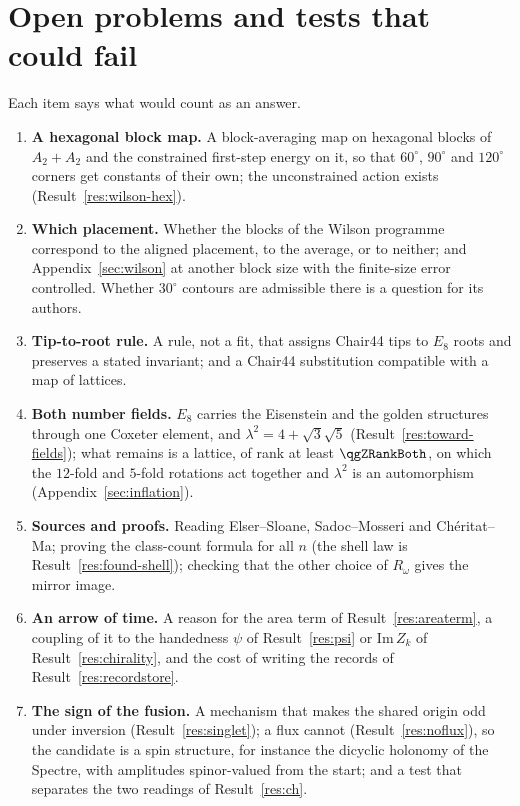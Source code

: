 \documentclass[11pt]{article}
\theoremstyle{definition}
\begin{document}
\section{Open problems and tests that could fail}\label{sec:open}
Each item says what would count as an answer.
\begin{enumerate}[leftmargin=1.6em,itemsep=1pt]
\item \textbf{A hexagonal block map.} A block-averaging map on hexagonal blocks of $A_2+A_2$ and the constrained first-step energy on it, so that $60^\circ$, $90^\circ$ and $120^\circ$ corners get constants of their own; the unconstrained action exists (Result~\ref{res:wilson-hex}).
\item \textbf{Which placement.} Whether the blocks of the Wilson programme correspond to the aligned placement, to the average, or to neither; and Appendix~\ref{sec:wilson} at another block size with the finite-size error controlled. Whether $30^\circ$ contours are admissible there is a question for its authors.
\item \textbf{Tip-to-root rule.} A rule, not a fit, that assigns Chair44 tips to $E_8$ roots and preserves a stated invariant; and a Chair44 substitution compatible with a map of lattices.
\item \textbf{Both number fields.} $E_8$ carries the Eisenstein and the golden structures through one Coxeter element, and $\lambda^2=4+\sqrt3\sqrt5$ (Result~\ref{res:toward-fields}); what remains is a lattice, of rank at least $\qgZRankBoth$, on which the $12$-fold and $5$-fold rotations act together and $\lambda^2$ is an automorphism (Appendix~\ref{sec:inflation}).
\item \textbf{Sources and proofs.} Reading Elser--Sloane, Sadoc--Mosseri and Ch\'eritat--Ma; proving the class-count formula for all $n$ (the shell law is Result~\ref{res:found-shell}); checking that the other choice of $R_\omega$ gives the mirror image.
\item\label{item:arrow} \textbf{An arrow of time.} A reason for the area term of Result~\ref{res:areaterm}, a coupling of it to the handedness $\psi$ of Result~\ref{res:psi} or $\mathrm{Im}\,Z_k$ of Result~\ref{res:chirality}, and the cost of writing the records of Result~\ref{res:recordstore}.
\item\label{item:rule} \textbf{The sign of the fusion.} A mechanism that makes the shared origin odd under inversion (Result~\ref{res:singlet}); a flux cannot (Result~\ref{res:noflux}), so the candidate is a spin structure, for instance the dicyclic holonomy of the Spectre, with amplitudes spinor-valued from the start; and a test that separates the two readings of Result~\ref{res:ch}.

\end{enumerate}
\end{document}
